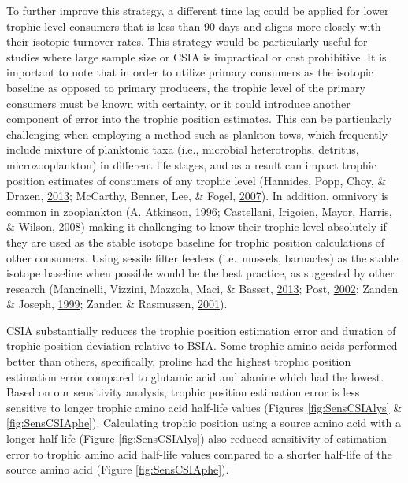 \documentclass [11pt, proquest] {uwthesis}[2015/03/03]
\begin{document}
To further improve this strategy, a different time lag could be applied
for lower trophic level consumers that is less than 90 days and aligns
more closely with their isotopic turnover rates. This strategy would be
particularly useful for studies where large sample size or CSIA is
impractical or cost prohibitive. It is important to note that in order
to utilize primary consumers as the isotopic baseline as opposed to
primary producers, the trophic level of the primary consumers must be
known with certainty, or it could introduce another component of error
into the trophic position estimates. This can be particularly
challenging when employing a method such as plankton tows, which
frequently include mixture of planktonic taxa (i.e., microbial
heterotrophs, detritus, microzooplankton) in different life stages, and
as a result can impact trophic position estimates of consumers of any
trophic level (Hannides, Popp, Choy, \& Drazen,
\protect\hyperlink{ref-Hannides2013}{2013}; McCarthy, Benner, Lee, \&
Fogel, \protect\hyperlink{ref-McCarthy2007}{2007}). In addition,
omnivory is common in zooplankton (A. Atkinson,
\protect\hyperlink{ref-Atkinson1996}{1996}; Castellani, Irigoien, Mayor,
Harris, \& Wilson, \protect\hyperlink{ref-Castellani2008}{2008}) making
it challenging to know their trophic level absolutely if they are used
as the stable isotope baseline for trophic position calculations of
other consumers. Using sessile filter feeders (i.e.~mussels, barnacles)
as the stable isotope baseline when possible would be the best practice,
as suggested by other research (Mancinelli, Vizzini, Mazzola, Maci, \&
Basset, \protect\hyperlink{ref-Mancinelli2013}{2013}; Post,
\protect\hyperlink{ref-Post2002}{2002}; Zanden \& Joseph,
\protect\hyperlink{ref-VanderZanden1999}{1999}; Zanden \& Rasmussen,
\protect\hyperlink{ref-VanderZanden2001}{2001}).

CSIA substantially reduces the trophic position estimation error and
duration of trophic position deviation relative to BSIA. Some trophic
amino acids performed better than others, specifically, proline had the
highest trophic position estimation error compared to glutamic acid and
alanine which had the lowest. Based on our sensitivity analysis, trophic
position estimation error is less sensitive to longer trophic amino acid
half-life values (Figures \ref{fig:SensCSIAlys} \&
\ref{fig:SensCSIAphe}). Calculating trophic position using a source
amino acid with a longer half-life (Figure \ref{fig:SensCSIAlys}) also
reduced sensitivity of estimation error to trophic amino acid half-life
values compared to a shorter half-life of the source amino acid (Figure
\ref{fig:SensCSIAphe}).
\end{document}
